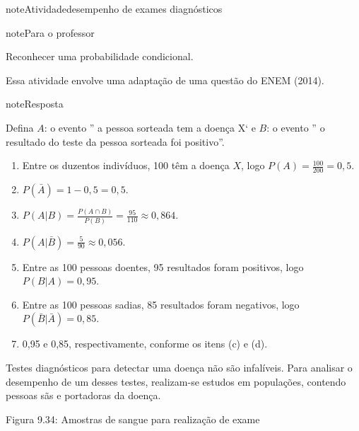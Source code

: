 \label{\detokenize{PE511-8:praticando-probabilidade-condicional}}\label{\detokenize{PE511-8::doc}}\begin{sphinxadmonition}{note}{Atividade}{desempenho de exames diagnósticos}
\label{ativ-especificidade-sensibilidade}

\begin{sphinxadmonition}{note}{Para o professor}

 Reconhecer uma probabilidade condicional.

 Essa atividade envolve uma adaptação de uma questão do ENEM (2014).

\begin{sphinxadmonition}{note}{Resposta}

Defina \(A\): o evento ” a pessoa sorteada tem a doença X{}` e \(B\): o evento ” o resultado do teste da pessoa sorteada foi positivo”.
\begin{enumerate}
\item {} 
Entre os duzentos indivíduos, 100 têm a doença \(X\), logo \(P(A)=\frac{100}{200}=0,5\).

\item {} 
\(P(\bar{A})=1-0,5=0,5\).

\item {} 
\(P(A|B)=\frac{P(A\cap B)}{P(B)}=\frac{95}{110}\approx 0,864\).

\item {} 
\(P(A|\bar{B})=\frac{5}{90}\approx 0,056\).

\item {} 
Entre as 100 pessoas doentes, 95 resultados foram positivos, logo \(P(B|A)=0,95\).

\item {} 
Entre as 100 pessoas sadias, 85 resultados foram negativos, logo \(P(\bar{B}|\bar{A})=0,85\).

\item {} 
0,95 e 0,85, respectivamente, conforme os itens (c) e (d).

\end{enumerate}
\end{sphinxadmonition}
\end{sphinxadmonition}

Testes diagnósticos para detectar uma doença não são infalíveis. Para analisar o desempenho de um desses testes, realizam-se estudos em populações, contendo pessoas sãs e portadoras da doença.
\label{\detokenize{PE511-8:fig-coloque-aqui-o-nome}}
\begin{figure}[H]
\centering

\noindent{}
\label{\detokenize{PE511-8:fig-coloque-aqui-o-nome}}\end{figure}

Figura 9.34: Amostras de sangue para realização de exame
\end{sphinxadmonition}

